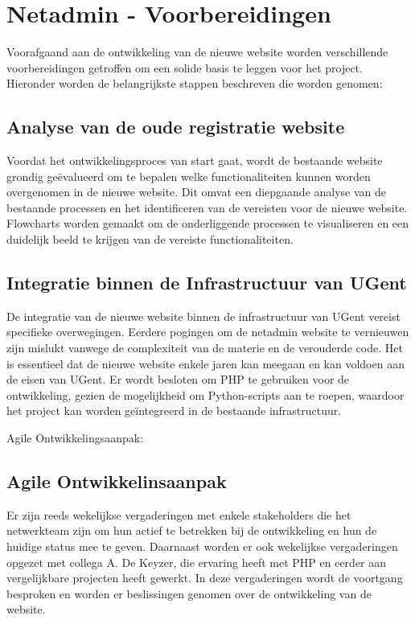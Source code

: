 
\chapter{Netadmin - Voorbereidingen}%
\label{ch:netadmin-voorbereidingen}

Voorafgaand aan de ontwikkeling van de nieuwe website worden verschillende voorbereidingen getroffen om een solide basis te leggen voor het project. Hieronder worden de belangrijkste stappen beschreven die worden genomen:

\section{Analyse van de oude registratie website}
Voordat het ontwikkelingsproces van start gaat, wordt de bestaande website grondig geëvalueerd om te bepalen welke functionaliteiten kunnen worden overgenomen in de nieuwe website. Dit omvat een diepgaande analyse van de bestaande processen en het identificeren van de vereisten voor de nieuwe website. Flowcharts worden gemaakt om de onderliggende processen te visualiseren en een duidelijk beeld te krijgen van de vereiste functionaliteiten.


\section{Integratie binnen de Infrastructuur van UGent}
De integratie van de nieuwe website binnen de infrastructuur van UGent vereist specifieke overwegingen. Eerdere pogingen om de netadmin website te vernieuwen zijn mislukt vanwege de complexiteit van de materie en de verouderde code. Het is essentieel dat de nieuwe website enkele jaren kan meegaan en kan voldoen aan de eisen van UGent. Er wordt besloten om PHP te gebruiken voor de ontwikkeling, gezien de mogelijkheid om Python-scripts aan te roepen, waardoor het project kan worden geïntegreerd in de bestaande infrastructuur.

Agile Ontwikkelingsaanpak:
\section{Agile Ontwikkelinsaanpak}
Er zijn reeds wekelijkse vergaderingen met enkele stakeholders die het netwerkteam zijn om hun actief te betrekken bij de ontwikkeling en hun de huidige status mee te geven. Daarnaast worden er ook wekelijkse vergaderingen opgezet met collega A. De Keyzer, die ervaring heeft met PHP en eerder aan vergelijkbare projecten heeft gewerkt. In deze vergaderingen wordt de voortgang besproken en worden er  beslissingen genomen over de ontwikkeling van de website.

